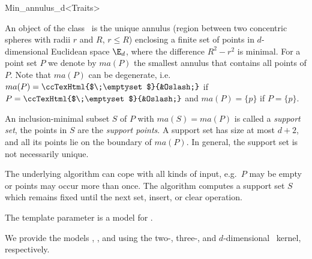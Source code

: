
\begin{ccRefClass}{Min_annulus_d<Traits>}


\ccSaveThreeColumns
\cgalMinAnnulusLayout

\ccDefinition

An object of the class \ccRefName\ is the unique annulus (region between
two concentric spheres with radii $r$ and $R$, $r \leq R$) enclosing a
finite set of points in $d$-dimensional Euclidean space $\E_d$, where the
difference $R^2-r^2$ is minimal. For a point set $P$ we denote by $ma(P)$
the smallest annulus that contains all points of $P$.  Note that $ma(P)$
can be degenerate,
i.e.~$ma(P)=\mbox{\ccTexHtml{$\;\emptyset$}{&Oslash;}}$ if
$P=\mbox{\ccTexHtml{$\;\emptyset$}{&Oslash;}}$ and $ma(P)=\{p\}$ if
$P=\{p\}$.

An inclusion-minimal subset $S$ of $P$ with $ma(S)=ma(P)$ is called a
\emph{support set},
the points in $S$ are the \emph{support points}.  A support set has size at
most $d+2$, and all its points lie on the boundary of $ma(P)$. In general,
the support set is not necessarily unique.

The underlying algorithm can cope with all kinds of input, e.g.~$P$ may be
empty or points may occur more than once. The algorithm computes a support
set $S$ which remains fixed until the next set, insert, or clear operation.


\ccRequirements
\ccIndexRequirements

The template parameter  is a model for .

We provide the models ,
, and  using the
two-, three-, and $d$-dimensional \cgal~kernel, respectively.

\ccTypes
\ccIndexClassTypes


\end{ccRefClass}
